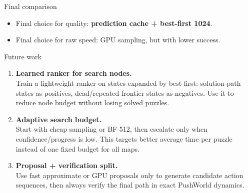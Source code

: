 \documentclass[aspectratio=169]{beamer}
\begin{document}
\begin{frame}{Final comparison}
  \small
  \centering

  \vspace{0.65em}
  \begin{itemize}
    \item Final choice for quality: \textbf{prediction cache + best-first 1024}.
    \item Final choice for raw speed: GPU sampling, but with lower success.
  \end{itemize}
\end{frame}

\begin{frame}{Future work}
  \small
  \begin{enumerate}
    \item \textbf{Learned ranker for search nodes.}\\
    Train a lightweight ranker on states expanded by best-first: solution-path states as positives, dead/repeated frontier states as negatives. Use it to reduce node budget without losing solved puzzles.

    \item \textbf{Adaptive search budget.}\\
    Start with cheap sampling or BF-512, then escalate only when confidence/progress is low. This targets better average time per puzzle instead of one fixed budget for all maps.

    \item \textbf{Proposal + verification split.}\\
    Use fast approximate or GPU proposals only to generate candidate action sequences, then always verify the final path in exact PushWorld dynamics.
  \end{enumerate}
\end{frame}
\end{document}
